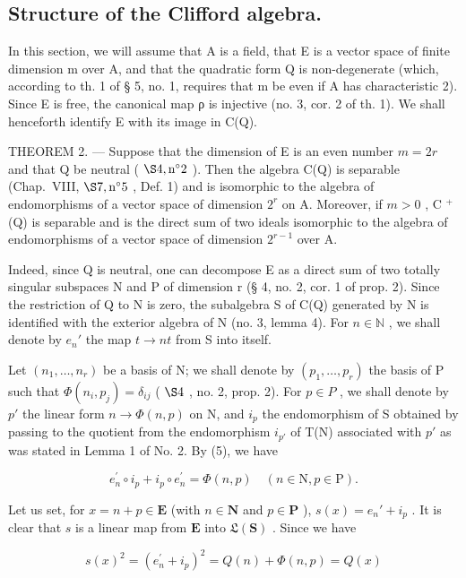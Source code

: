 \subsection{Structure of the Clifford algebra.}

In this section, we will assume that A is a field, that E is a vector space of finite dimension m over A, and that the quadratic form Q is non-degenerate (which, according to th. 1 of § 5, no. 1, requires that m be even if A has characteristic 2). Since E is free, the canonical map ρ is injective (no. 3, cor. 2 of th. 1). We shall henceforth identify E with its image in C(Q).

THEOREM 2. --- Suppose that the dimension of E is an even number \(m = 2r\) and that Q be neutral ( \(\S 4, \text{n}^{\circ} 2\) ). Then the algebra C(Q) is separable (Chap.~VIII, \(\S 7, \text{n}^{\circ} 5\) , Def. 1) and is isomorphic to the algebra of endomorphisms of a vector space of dimension \(2^{r}\) on A. Moreover, if \(m > 0\) , C \(^{+}\) (Q) is separable and is the direct sum of two ideals isomorphic to the algebra of endomorphisms of a vector space of dimension \(2^{r-1}\) over A.

Indeed, since Q is neutral, one can decompose E as a direct sum of two totally singular subspaces N and P of dimension r (§ 4, no. 2, cor. 1 of prop. 2). Since the restriction of Q to N is zero, the subalgebra S of C(Q) generated by N is identified with the exterior algebra of N (no. 3, lemma 4). For \(n \in \mathbb{N}\) , we shall denote by \(e_n'\) the map \(t \to nt\) from S into itself.

Let \((n_{1},\ldots,n_{r})\) be a basis of N; we shall denote by \((p_{1},\ldots,p_{r})\) the basis of P such that \(\Phi(n_{i},p_{j})=\delta_{ij}\) ( \(\S 4\) , no. 2, prop. 2). For \(p\in P\) , we shall denote by \(p'\) the linear form \(n\to\Phi(n,p)\) on N, and \(i_{p}\) the endomorphism of S obtained by passing to the quotient from the endomorphism \(i_{p'}\) of T(N) associated with \(p'\) as was stated in Lemma 1 of No. 2. By (5), we have

\[
e _ {n} ^ {\prime} \circ i _ {p} + i _ {p} \circ e _ {n} ^ {\prime} = \Phi (n, p) \quad (n \in \mathrm{N}, p \in \mathrm{P}).\tag{12}
\]

Let us set, for \(x = n + p \in \mathbf{E}\) (with \(n \in \mathbf{N}\) and \(p \in \mathbf{P}\) ), \(s(x) = e_n' + i_p\) . It is clear that \(s\) is a linear map from \(\mathbf{E}\) into \(\mathfrak{L}(\mathbf{S})\) . Since we have

\[
s (x) ^ {2} = \left(e _ {n} ^ {\prime} + i _ {p}\right) ^ {2} = Q (n) + \Phi (n, p) = Q (x)
\]

